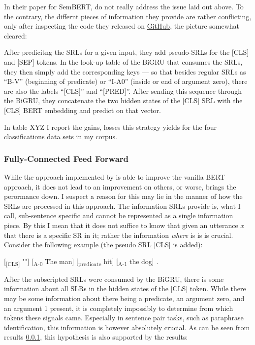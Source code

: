In their paper for SemBERT, \cite{zhang2019semantics} do not really address the issue laid out above.
To the contrary, the differnt pieces of information they provide are rather conflicting, only after inspecting the code they released on \href{https://github.com/cooelf/SemBERT/}{GitHub}, the picture somewhat cleared:

After predicitng the SRLs for a given input, they add pseudo-SRLs for the [CLS] and [SEP] tokens.
In the look-up table of the BiGRU that consumes the SRLs, they then simply add the corresponding keys --- so that besides regular SRLs as ``B-V'' (beginning of predicate) or ``I-A0'' (inside or end of argument zero), there are also the labels ``[CLS]'' and ``[PRED]''.
After sending this sequence through the BiGRU, they concatenate the two hidden states of the [CLS] SRL with the [CLS] BERT embedding and predict on that vector.

In table XYZ I report the gains, losses this strategy yields for the four classifications data sets in my corpus.

\subsubsection{Fully-Connected Feed Forward}

While the approach implemented by \cite{zhang2019semantics} is able to improve the vanilla BERT approach, it does not lead to an improvement on others, or worse, brings the perormance down.
I suspect a reason for this may lie in the manner of how the SRLs are processed in this approach.
The information SRLs provide is, what I call, sub-sentence specific and cannot be represented as a single information piece.
By this I mean that it does not suffice to know that given an utterance $x$ that there is a specific SR in it; rather the information \emph{where} is is is crucial.
Consider the following example (the pseudo SRL [CLS] is added):

[\textsubscript{[CLS]} ""] [\textsubscript{A-0} The man] [\textsubscript{predicate} hit] [\textsubscript{A-1} the dog] .

After the subscripted SRLs were consumed by the BiGRU, there is some information about all SLRs in the hidden states of the [CLS] token.
While there may be some information about there being a predicate, an argument zero, and an argument 1 present, it is completely impossibly to determine from which tokens these signals came.
Especially in sentence pair tasks, such as paraphrase identification, this information is however absolutely crucial.
As can be seen from results \ref{}, this hypothesis is also supported by the results:



